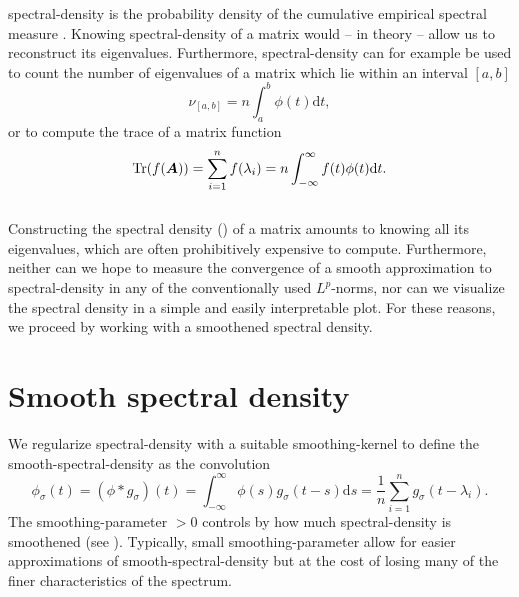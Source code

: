 \gls{spectral-density} is the probability density \cite{klenke2013probability}
of the cumulative empirical spectral measure \cite{chen2021slq}. Knowing \gls{spectral-density}
of a matrix would -- in theory -- allow us to reconstruct its eigenvalues.
Furthermore, \gls{spectral-density} can for example be used to count
the number of eigenvalues of a matrix which lie within an interval $[a, b]$
\begin{equation}
    \nu_{[a, b]} = n \int_{a}^{b} \phi(t) \mathrm{d}t,
    \label{equ:1-introduction-eigenvalue-counting}
\end{equation}
or to compute the trace of a matrix function \cite{lin2017randomized}
\begin{equation}
    \operatorname{Tr}(f(\boldsymbol{A})) = \sum_{i=1}^n f(\lambda_i) = n \int_{-\infty}^{\infty} f(t) \phi(t) \mathrm{d}t.
    \label{equ:1-introduction-matrix-trace}
\end{equation}\\

Constructing the spectral density ()
of a matrix amounts to knowing all its eigenvalues, which are often prohibitively
expensive to compute. Furthermore, neither can we hope to measure the convergence
of a smooth approximation to \gls{spectral-density} in any of the conventionally
used $L^p$-norms, nor can we visualize the spectral density in a simple
and easily interpretable plot. For these reasons, we proceed by working with a
smoothened spectral density.


\section{Smooth spectral density}
\label{sec:1-introduction-properties}

We regularize \gls{spectral-density} with a suitable \gls{smoothing-kernel}
to define the \gls{smooth-spectral-density} as the convolution
\begin{equation}
    \phi_{\sigma}(t) = (\phi \ast g_{\sigma})(t) = \int_{-\infty}^{\infty} \phi(s) g_{\sigma}(t - s) \mathrm{d}s = \frac{1}{n} \sum_{i=1}^{n} g_{\sigma}(t - \lambda_i).
    \label{equ:1-introduction-def-smooth-spectral-density}
\end{equation}
The \gls{smoothing-parameter} $>0$ controls by how much \gls{spectral-density} is
smoothened (see ). Typically,
small \gls{smoothing-parameter} allow for easier approximations of \gls{smooth-spectral-density}
but at the cost of losing many of the finer characteristics of the spectrum.\\

